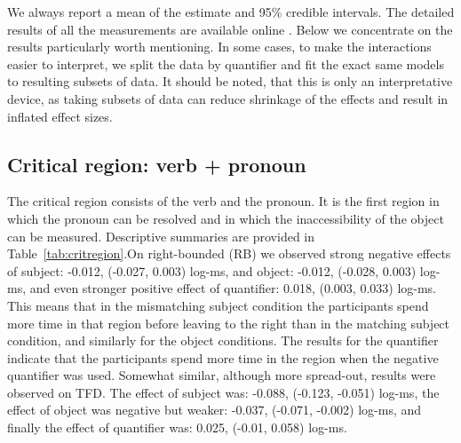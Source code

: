 
We always report a mean of the estimate and 95\% credible intervals.
The detailed results of all the measurements are available online \cite{osf-repo}. Below we concentrate on the results particularly worth mentioning.
In some cases, to make the interactions easier to interpret, we split the data by quantifier and fit the exact same models to resulting subsets of data. It should be noted, that this is only an interpretative device, as taking subsets of data can reduce shrinkage of the effects and result in inflated effect sizes.





\subsection{Critical region: verb + pronoun}

The critical region  consists of the verb and the pronoun. It is the first region in which the pronoun can be resolved and in which the inaccessibility of the object can be measured. Descriptive summaries are provided in Table~\ref{tab:critregion}.On right-bounded (RB) we observed strong negative effects of subject: -0.012, (-0.027, 0.003) log-ms, and object: -0.012, (-0.028, 0.003) log-ms, and even stronger positive effect of quantifier: 0.018, (0.003, 0.033) log-ms. This means that in the mismatching subject condition the participants spend more time in that region before leaving to the right than in the matching subject condition, and similarly for the object conditions. The results for the quantifier indicate that the participants spend more time in the region when the negative quantifier was used.
Somewhat similar, although more spread-out, results were observed on TFD. The effect of subject was: -0.088, (-0.123, -0.051) log-ms, the effect of object was negative but weaker: -0.037, (-0.071, -0.002) log-ms, and finally the effect of quantifier was: 0.025, (-0.01, 0.058) log-ms.

